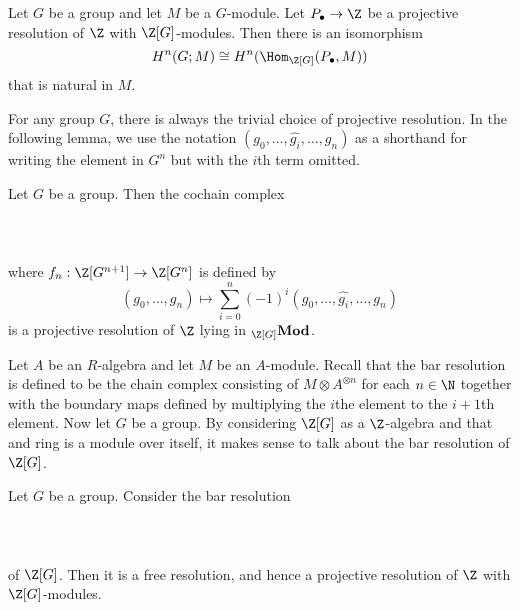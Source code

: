 \documentclass[a4paper]{article}
\begin{document}
\begin{prp}{}{} Let $G$ be a group and let $M$ be a $G$-module. Let $P_\bullet\to\Z$ be a projective resolution of $\Z$ with $\Z[G]$-modules. Then there is an isomorphism $$H^n(G;M)\cong H^n(\Hom_{\Z[G]}(P_\bullet,M))$$ that is natural in $M$. 
\end{prp}

For any group $G$, there is always the trivial choice of projective resolution. 
In the following lemma, we use the notation $(g_0,\dots,\hat{g_i},\dots,g_n)$ as a shorthand for writing the element in $G^n$ but with the $i$th term omitted. 

\begin{lmm}{}{} Let $G$ be a group. Then the cochain complex \\~\\
\\~\\ where $f_n:\Z[G^{n+1}]\to\Z[G^n]$ is defined by $$(g_0,\dots,g_n)\mapsto\sum_{i=0}^n(-1)^i(g_0,\dots,\hat{g_i},\dots,g_n)$$ is a projective resolution of $\Z$ lying in ${_{\Z[G]}}\bold{Mod}$. 
\end{lmm}

Let $A$ be an $R$-algebra and let $M$ be an $A$-module. Recall that the bar resolution is defined to be the chain complex consisting of $M\otimes A^{\otimes n}$ for each $n\in\N$ together with the boundary maps defined by multiplying the $i$the element to the $i+1$th element. Now let $G$ be a group. By considering $\Z[G]$ as a $\Z$-algebra and that and ring is a module over itself, it makes sense to talk about the bar resolution of $\Z[G]$. 

\begin{prp}{}{} Let $G$ be a group. Consider the bar resolution \\~\\
\\~\\
of $\Z[G]$. Then it is a free resolution, and hence a projective resolution of $\Z$ with $\Z[G]$-modules. 
\end{prp}
\end{document}
